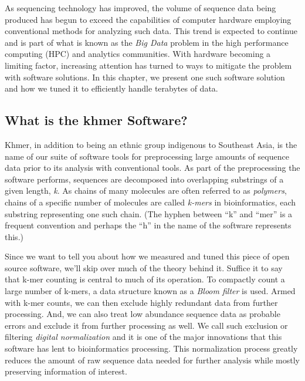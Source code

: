 \documentclass{article}
\begin{document}
As sequencing technology has improved, the volume of sequence data being produced has begun to exceed the capabilities of computer hardware employing conventional methods for analyzing such data. This trend is expected to continue and is part of what is known as the \textit{Big Data} problem in the high performance computing (HPC) and analytics communities. With hardware becoming a limiting factor, increasing attention has turned to ways to mitigate the problem with software solutions. In this chapter, we present one such software solution and how we tuned it to efficiently handle terabytes of data.

\subsection{What is the khmer Software?}

Khmer, in addition to being an ethnic group indigenous to Southeast Asia, is the name of our suite of software tools for preprocessing large amounts of sequence data prior to its analysis with conventional tools. As part of the preprocessing the software performs, sequences are decomposed into overlapping substrings of a given length, \textit{k}. As chains of many molecules are often referred to as \textit{polymers}, chains of a specific number of molecules are called \textit{k-mers} in bioinformatics, each substring representing one such chain. (The hyphen between ``k'' and ``mer'' is a frequent convention and perhaps the ``h'' in the name of the software represents this.)


Since we want to tell you about how we measured and tuned this piece of open source software, we'll skip over much of the theory behind it. Suffice it to say that k-mer counting is central to much of its operation. To compactly count a large number of k-mers, a data structure known as a \textit{Bloom filter} is used. Armed with k-mer counts, we can then exclude highly redundant data from further processing. And, we can also treat low abundance sequence data as probable errors and exclude it from further processing as well. We call such exclusion or filtering \textit{digital normalization} and it is one of the major innovations that this software has lent to bioinformatics processing. This normalization process greatly reduces the amount of raw sequence data needed for further analysis while mostly preserving information of interest.
\end{document}
